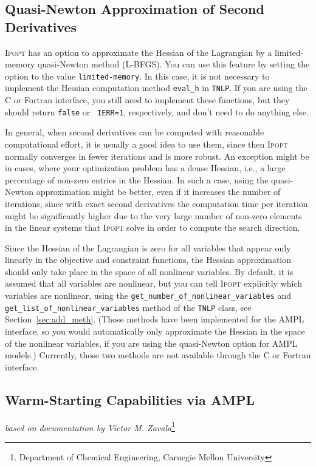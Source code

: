 \documentclass[10pt]{article}
\newcommand{\Ipopt}{\textsc{Ipopt}\xspace}
\begin{document}
\subsection{Quasi-Newton Approximation of Second Derivatives}
\label{sec:quasiNewton}

\Ipopt has an option to approximate the Hessian of the Lagrangian by
a limited-memory quasi-Newton method (L-BFGS).  You can use this
feature by setting the  
option to the value {\tt limited-memory}.  In this case, it is not necessary to
implement the Hessian computation method {\tt eval\_h} in {\tt TNLP}.
If you are using the C or Fortran interface, you still need to
implement these functions, but they should return {\tt false} or {\tt
  IERR=1}, respectively, and don't need to do anything else.

In general, when second derivatives can be computed with reasonable
computational effort, it is usually a good idea to use them, since
then \Ipopt normally converges in fewer iterations and is more
robust.  An exception might be in cases, where your optimization
problem has a dense Hessian, i.e., a large percentage of non-zero entries
in the Hessian. In such a case, using the quasi-Newton approximation might be
better, even if it increases the number of iterations, since with exact
second derivatives the computation time per iteration might be significantly 
higher due to the very large number of non-zero elements in the linear systems 
that \Ipopt solve in order to compute the search direction.

Since the Hessian of the Lagrangian is zero for all variables that
appear only linearly in the objective and constraint functions, the
Hessian approximation should only take place in the space of all
nonlinear variables.  By default, it is assumed that all variables are
nonlinear, but you can tell \Ipopt explicitly which variables are
nonlinear, using the {\tt get\_number\_of\_nonlinear\_variables} and
{\tt get\_list\_of\_nonlinear\_variables} method of the {\tt TNLP}
class, see Section~\ref{sec:add_meth}.  (Those methods have been
implemented for the AMPL interface, so you would automatically only
approximate the Hessian in the space of the nonlinear variables, if
you are using the quasi-Newton option for AMPL models.)  Currently,
those two methods are not available through the C or Fortran
interface.

\subsection{Warm-Starting Capabilities via AMPL}
\hfill \textit{based on documentation by Victor M. Zavala}\footnote{Department of Chemical Engineering, Carnegie Mellon University}
\medskip
\end{document}

